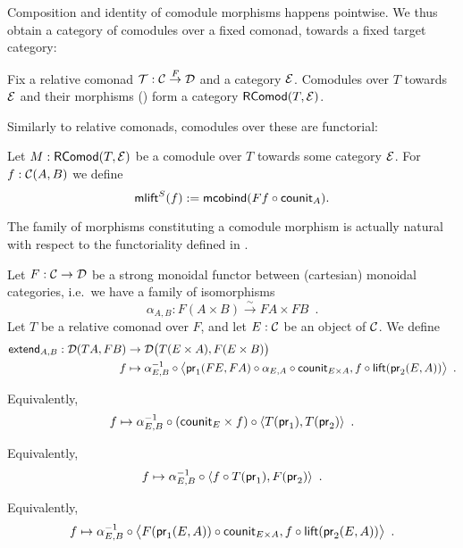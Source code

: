 \documentclass{amsart}
\begin{document}
Composition and identity of comodule morphisms happens pointwise. We thus obtain a category of comodules
over a fixed comonad, towards a fixed target category:

\begin{remark}
 Fix a relative comonad $\T : \C\stackrel{F}{\to}\D$ and a category $\E$.
 Comodules over $T$ towards $\E$ and their morphisms () form a category $\RComod(T,\E)$.
\end{remark}

Similarly to relative comonads, comodules over these are functorial:

\begin{definition}\label{def:comodule_lift}
 Let $M : \RComod(T,\E)$ be a comodule over $T$ towards some category $\E$. For $f : \C(A,B)$ we define
  \[ \mlift^S(f) := \mcobind(\comp{\counit_A}{Ff}) .  \]
\end{definition}


\begin{remark}
  The family of morphisms constituting a comodule morphism is actually natural with respect to the functoriality 
  defined in .
\end{remark}









\begin{definition}\label{def:extend}
 Let $F : \C\to \D$ be a strong monoidal functor between (cartesian) monoidal categories, 
 i.e.\ we have a family of isomorphisms
  \[ \alpha_{A,B} : F(A\times B) \xrightarrow{\sim} FA\times FB\enspace . \] 
  Let $T$ be a relative comonad over $F$, and let $E : \C$ be an object of $\C$.
 We define
 \begin{align*} \extend_{A,B} : \D(TA,FB) &\to \D\bigl(T(E\times A),F(E\times B)\bigr)\\
                                   f   &\mapsto \comp{\bigl\langle \comp{\counit_{E\times A}}{\comp{\alpha_{E,A}}{\pr_1(FE,FA)}}, \comp{\lift(\pr_2(E,A))}{f} \bigr\rangle}{\alpha_{E,B}^{-1}} \enspace .
\end{align*}

Equivalently,
  \[ f   \mapsto \comp{\comp{\langle T(\pr_1) , T(\pr_2) \rangle}{(\counit_E\times f)}}{\alpha_{E,B}^{-1}} \enspace .
  \]

  
Equivalently,
  \[ f   \mapsto \comp{\langle \comp{T(\pr_1)}{f} , F(\pr_2) \rangle}{\alpha_{E,B}^{-1}} \enspace .
  \]
  
Equivalently,
  \[f  \mapsto \comp{\bigl\langle \comp{\counit_{E\times A}}{F(\pr_1(E,A))}, \comp{\lift(\pr_2(E,A))}{f} \bigr\rangle}{\alpha_{E,B}^{-1}} \enspace .
  \]
\end{definition}
\end{document}
